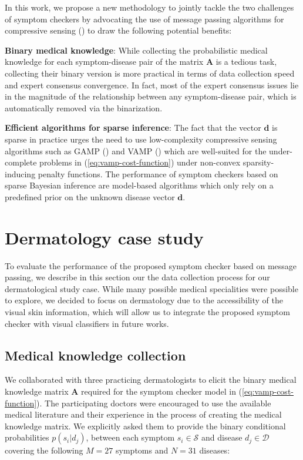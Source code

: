 \documentclass[pmlr,twocolumn,10pt]{jmlr} %
\begin{document}
In this work, we propose a new methodology to jointly tackle the two challenges of symptom checkers by advocating the use of message passing algorithms for compressive sensing (\cite{donoho2009message}) to draw the following potential benefits:\vspace{0.2cm}

\noindent\textbf{Binary medical knowledge}: While collecting the probabilistic medical knowledge for each symptom-disease pair of the matrix $\mathbf{A}$ is a tedious task, collecting their binary version is more practical in terms of data collection speed and expert consensus convergence. In fact, most of the expert consensus issues lie in the magnitude of the relationship between any symptom-disease pair, which is automatically removed via the binarization.\vspace{0.2cm}

\noindent \textbf{Efficient algorithms for sparse inference}: The fact that the vector $\mathbf{d}$ is sparse in practice urges the need to use low-complexity compressive sensing algorithms such as GAMP (\cite{rangan2011generalized}) and VAMP (\cite{rangan2019vector}) which are well-suited for the under-complete problems in (\ref{eq:vamp-cost-function}) under non-convex sparsity-inducing penalty functions. The performance of symptom checkers based on sparse Bayesian inference are model-based algorithms which only rely on a predefined prior on the unknown disease vector $\mathbf{d}$.\vspace{-0.3cm}

\section{Dermatology case study}
To evaluate the performance of the proposed symptom checker based on message passing, we describe in this section our the data collection process for our dermatological study case. While many possible medical specialities were possible to explore, we decided to focus on dermatology due to the accessibility of the visual skin information, which will allow us to integrate the proposed symptom checker with visual classifiers in future works.\vspace{-0.3cm}
\subsection{Medical knowledge collection}
We collaborated with three practicing dermatologists to elicit the binary medical knowledge matrix $\mathbf{A}$ required for the symptom checker model in (\ref{eq:vamp-cost-function}). The participating doctors were encouraged to use the available medical literature and their experience in the process of creating the medical knowledge matrix. We explicitly asked them to provide the binary conditional probabilities $p(s_i|d_j)$, between each symptom $s_i \in \mathcal{S}$ and disease $d_j \in \mathcal{D}$ covering the following $M=27$ symptoms and $N=31$ diseases:
\end{document}
